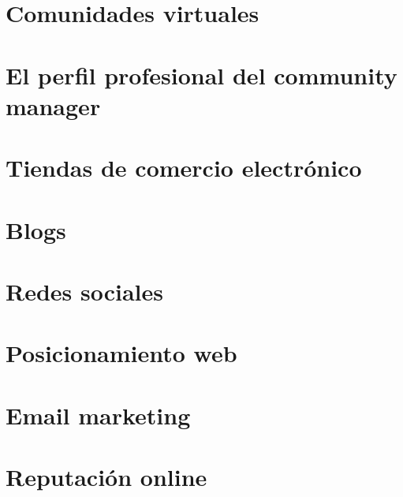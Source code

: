 \documentclass[12pt,fleqn]{book}
\begin{document}

\part{Comunidades virtuales}




\part{El perfil profesional del community manager}


\part{Tiendas de comercio electrónico}


\part{Blogs}


\part{Redes sociales}







\part{Posicionamiento web}


\part{Email marketing}


\part{Reputación online}



\cleardoublepage
{}
\setlength{\columnsep}{0.75cm}
\printindex

\end{document}
